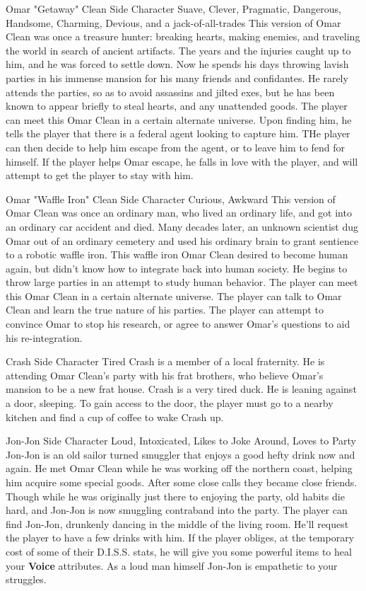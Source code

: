 {Omar "Getaway" Clean}
{Side Character}
{Suave, Clever, Pragmatic, Dangerous, Handsome, Charming, Devious, and a jack-of-all-trades}
{This version of Omar Clean was once a treasure hunter: breaking hearts, making enemies, and traveling the world in search of ancient artifacts. The years and the injuries caught up to him, and he was forced to settle down. Now he spends his days throwing lavish parties in his immense mansion for his many friends and confidantes. He rarely attends the parties, so as to avoid assassins and jilted exes, but he has been known to appear briefly to steal hearts, and any unattended goods.}
{The player can meet this Omar Clean in a certain alternate universe. Upon finding him, he tells the player that there is a federal agent looking to capture him. THe player can then decide to help him escape from the agent, or to leave him to fend for himself. If the player helps Omar escape, he falls in love with the player, and will attempt to get the player to stay with him.}

{Omar "Waffle Iron" Clean}
{Side Character}
{Curious, Awkward}
{This version of Omar Clean was once an ordinary man, who lived an ordinary life, and got into an ordinary car accident and died. Many decades later, an unknown  scientist dug Omar out of an ordinary cemetery and used his ordinary brain to grant sentience to a robotic waffle iron. This waffle iron Omar Clean desired to become human again, but didn't know how to integrate back into human society. He begins to throw large parties in an attempt to study human behavior.}
{The player can meet this Omar Clean in a certain alternate universe. The player can talk to Omar Clean and learn the true nature of his parties. The player can attempt to convince Omar to stop his research, or agree to answer Omar's questions to aid his re-integration.}

{Crash}
{Side Character}
{Tired}
{Crash is a member of a local fraternity. He is attending Omar Clean's party with his frat brothers, who believe Omar's mansion to be a new frat house.}
{Crash is a very tired duck. He is leaning against a door, sleeping. To gain access to the door, the player must go to a nearby kitchen and find a cup of coffee to wake Crash up.}

{Jon-Jon}
{Side Character}
{Loud, Intoxicated, Likes to Joke Around, Loves to Party}
{Jon-Jon is an old sailor turned smuggler that enjoys a good hefty drink now and again. He met Omar Clean while he was working off the northern coast, helping him acquire some special goods. After some close calls they became close friends. Though while he was originally just there to enjoying the party, old habits die hard, and Jon-Jon is now smuggling contraband into the party.}
{The player can find Jon-Jon, drunkenly dancing in the middle of the living room. He'll request the player to have a few drinks with him. If the player obliges, at the temporary cost of some of their D.I.S.S. stats, he will give you some powerful items to heal your \textbf{Voice} attributes. As a loud man himself Jon-Jon is empathetic to your struggles.}

